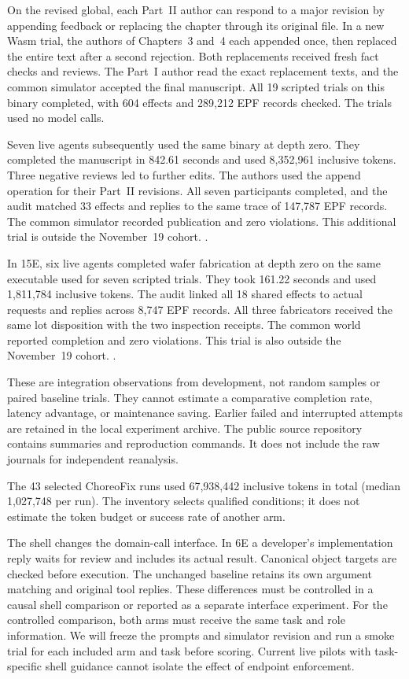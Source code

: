 \documentclass[10pt]{article}
\begin{document}
On the revised global, each Part~II author can respond to a major revision
by appending feedback or replacing the chapter through its original file.
In a new Wasm trial, the authors of Chapters~3 and~4 each appended once,
then replaced the entire text after a second rejection. Both replacements
received fresh fact checks and reviews. The Part~I author read the exact
replacement texts, and the common simulator accepted the final manuscript.
All 19 scripted trials on this binary completed, with 604 effects and
289,212 EPF records checked. The trials used no model calls.

Seven live agents subsequently used the same binary at depth zero. They
completed the manuscript in 842.61 seconds and used 8,352,961 inclusive
tokens. Three negative reviews led to further edits. The authors used the
append operation for their Part~II revisions. All seven participants
completed, and the audit matched 33 effects and replies to the same trace
of 147,787 EPF records. The common simulator recorded publication and zero
violations. This additional trial is outside the November~19 cohort.
.

In 15E, six live agents completed wafer fabrication at depth zero on the same
executable used for seven scripted trials. They took 161.22 seconds and used
1,811,784 inclusive tokens. The audit linked all 18 shared effects to actual
requests and replies across 8,747 EPF records. All three fabricators received
the same lot disposition with the two inspection receipts. The common world
reported completion and zero violations. This trial is also outside the
November~19 cohort. .

These are integration observations from development, not random samples or
paired baseline trials. They cannot estimate a comparative completion rate,
latency advantage, or maintenance saving. Earlier failed and interrupted
attempts are retained in the local experiment archive. The public source
repository contains summaries and reproduction commands. It does not include
the raw journals for independent reanalysis.

The 43 selected ChoreoFix runs used 67,938,442 inclusive tokens in total (median 1,027,748 per run). The inventory selects qualified conditions; it does not estimate the token budget or success rate of another arm.

The shell changes the domain-call interface. In 6E a developer's implementation
reply waits for review and includes its actual result. Canonical object targets
are checked before execution. The unchanged baseline retains its own argument
matching and original tool replies. These differences must be controlled in a
causal shell comparison or reported as a separate interface experiment.
For the controlled comparison, both arms must receive the same task and
role information. We will freeze the prompts and simulator revision and run
a smoke trial for each included arm and task before scoring. Current live
pilots with task-specific shell guidance cannot isolate the effect of endpoint
enforcement.
\end{document}

